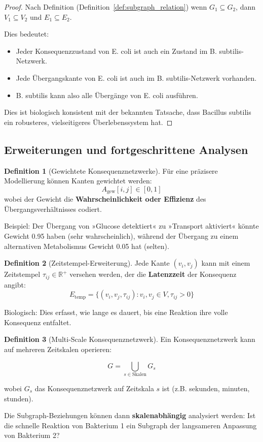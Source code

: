 \documentclass[a4paper,12pt]{article}
\theoremstyle{definition}
\newtheorem{definition}{Definition}
\begin{document}
\begin{proof}
Nach Definition (Definition~\ref{def:subgraph_relation}) wenn $G_1 \subseteq G_2$, dann $V_1 \subseteq V_2$ und $E_1 \subseteq E_2$.

Dies bedeutet:
\begin{itemize}
    \item Jeder Konsequenzzustand von E. coli ist auch ein Zustand im B. subtilis-Netzwerk.
    \item Jede Übergangskante von E. coli ist auch im B. subtilis-Netzwerk vorhanden.
    \item B. subtilis kann also alle Übergänge von E. coli ausführen.
\end{itemize}

Dies ist biologisch konsistent mit der bekannten Tatsache, dass Bacillus subtilis ein robusteres, vielseitigeres Überlebenssystem hat.
\end{proof}

\subsection{Erweiterungen und fortgeschrittene Analysen}

\begin{definition}[Gewichtete Konsequenznetzwerke]
Für eine präzisere Modellierung können Kanten gewichtet werden:
\[
A_{\text{gew}}[i,j] \in [0, 1]
\]
wobei der Gewicht die \textbf{Wahrscheinlichkeit oder Effizienz} des Übergangsverhältnisses codiert.

Beispiel: Der Übergang von »Glucose detektiert« zu »Transport aktiviert« könnte Gewicht 0.95 haben (sehr wahrscheinlich), während der Übergang zu einem alternativen Metabolismus Gewicht 0.05 hat (selten).
\end{definition}

\begin{definition}[Zeitstempel-Erweiterung]
Jede Kante $(v_i, v_j)$ kann mit einem Zeitstempel $\tau_{ij} \in \mathbb{R}^+$ versehen werden, der die \textbf{Latenzzeit} der Konsequenz angibt:
\[
E_{\text{temp}} = \{(v_i, v_j, \tau_{ij}) : v_i, v_j \in V, \tau_{ij} > 0\}
\]

Biologisch: Dies erfasst, wie lange es dauert, bis eine Reaktion ihre volle Konsequenz entfaltet.
\end{definition}

\begin{definition}[Multi-Scale Konsequenznetzwerk]
Ein Konsequenznetzwerk kann auf mehreren Zeitskalen operieren:

\[
G = \bigcup_{s \in \text{Skalen}} G_s
\]

wobei $G_s$ das Konsequenznetzwerk auf Zeitskala $s$ ist (z.B. sekunden, minuten, stunden).

Die Subgraph-Beziehungen können dann \textbf{skalenabhängig} analysiert werden: Ist die schnelle Reaktion von Bakterium 1 ein Subgraph der langsameren Anpassung von Bakterium 2?
\end{definition}
\end{document}
